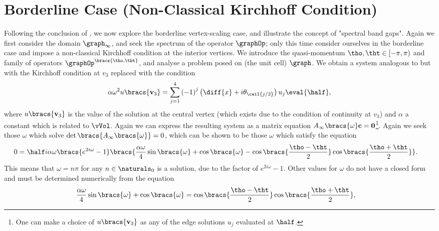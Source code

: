 \section{Borderline Case (Non-Classical Kirchhoff Condition)} \label{sec:Graph2DNonClassicalKirchhoff}
Following the conclusion of , we now explore the borderline vertex-scaling case, and illustrate the concept of "spectral band gaps".
Again we first consider the domain $\graph_{\infty}$, and seek the spectrum of the operator $\graphOp$; only this time consider ourselves in the borderline case and impose a non-classical Kirchhoff condition at the interior vertices.
We introduce the quasi-momentum $\tho,\tht\in[-\pi,\pi)$ and family of operators $\graphOp^{\bracs{\tho,\tht}}$, and analyse a problem posed on (the unit cell) $\graph$.
We obtain a system analogous to  but with the Kirchhoff condition at $v_{3}$ replaced with the  condition
\begin{align*}
	\alpha\omega^{2}u\bracs{\mathbf{v}_{3}} = \sum_{j=1}^{4}\left(-1\right)^{j}\left(\diff{x} + i\theta_{\ceil{j/2}}\right)u_{j}\eval{\half}, %
\end{align*}
where $u\bracs{\mathbf{v}_{3}}$ is the value of the solution at the central vertex (which exists due to the condition of continuity at $v_{3}$) and $\alpha$ a constant which is related to $\vVol$.
Again we can express the resulting system as a matrix equation $A_{\infty}\bracs{\omega}\mathbf{c}=\mathbf{0}$\footnote{One can make a choice of $u\bracs{\mathbf{v}_3}$ as any of the edge solutions $u_{j}$ evaluated at $\half$.}.
Again we seek those $\omega$ which solve $\det\bracs{A_{\infty}\bracs{\omega}}=0$, which can be shown to be those $\omega$ which satisfy the equation
\begin{align*}
	0 &= \half i\alpha\omega\bracs{e^{2i\omega}-1}\bracs{ \frac{\alpha\omega}{4}\sin\bracs{\omega} + \cos\bracs{\omega} - \cos\bracs{\frac{\tho-\tht}{2}}\cos\bracs{\frac{\tho+\tht}{2}} }.
\end{align*}
This means that $\omega=n\pi$ for any $n\in\naturals_{0}$ is a solution, due to the factor of $e^{2i\omega}-1$.
Other values for $\omega$ do not have a closed form and must be determined numerically from the equation
\begin{align}
	\frac{\alpha\omega}{4}\sin\bracs{\omega} + \cos\bracs{\omega} &= \cos\bracs{\frac{\tho-\tht}{2}}\cos\bracs{\frac{\tho+\tht}{2}}, \label{eq:GraphNonClassicalTransendental}
\end{align}
